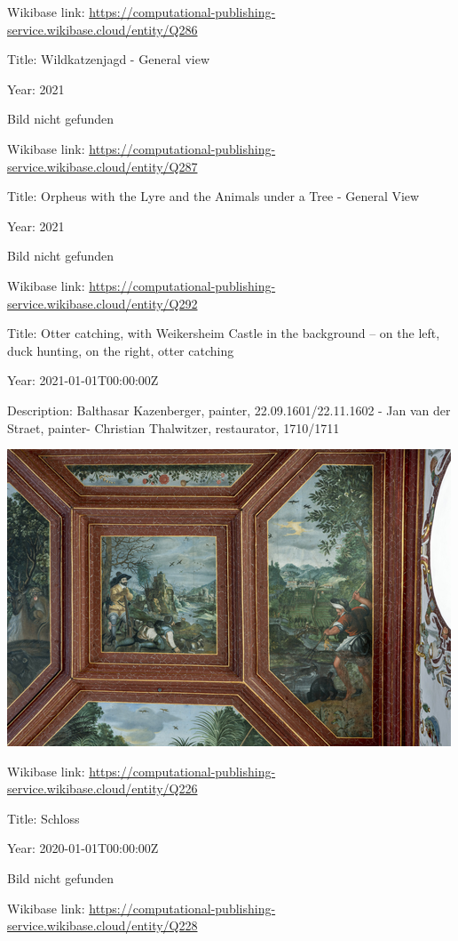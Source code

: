 \documentclass[
  letterpaper,
]{book}
\begin{document}
Wikibase link:
\url{https://computational-publishing-service.wikibase.cloud/entity/Q286}

Title: Wildkatzenjagd - General view

Year: 2021

Bild nicht gefunden

Wikibase link:
\url{https://computational-publishing-service.wikibase.cloud/entity/Q287}

Title: Orpheus with the Lyre and the Animals under a Tree - General View

Year: 2021

Bild nicht gefunden

Wikibase link:
\url{https://computational-publishing-service.wikibase.cloud/entity/Q292}

Title: Otter catching, with Weikersheim Castle in the background -- on
the left, duck hunting, on the right, otter catching

Year: 2021-01-01T00:00:00Z

Description: Balthasar Kazenberger, painter, 22.09.1601/22.11.1602 - Jan
van der Straet, painter- Christian Thalwitzer, restaurator, 1710/1711

\includegraphics{paintings_files/figure-pdf/cell-3-output-112.png}

Wikibase link:
\url{https://computational-publishing-service.wikibase.cloud/entity/Q226}

Title: Schloss

Year: 2020-01-01T00:00:00Z

Bild nicht gefunden

Wikibase link:
\url{https://computational-publishing-service.wikibase.cloud/entity/Q228}
\end{document}
